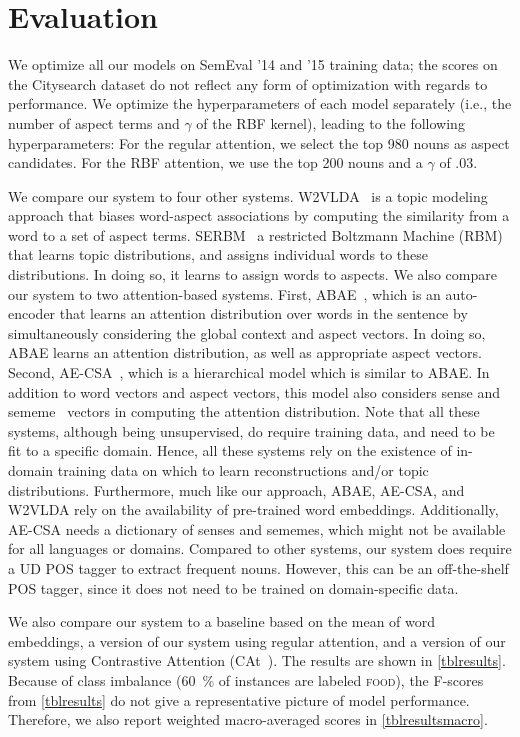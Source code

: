 \documentclass[11pt,a4paper]{article}
\newlength{\catheight}
\newcommand{\ourmodel}{CAt~\raisebox{-0.1ex}{\texttt{[image: fig/cat]}}} \definecolor{aspectcolor}{HTML}{fb7e5e}
\begin{document}
\section{Evaluation}

We optimize all our models on SemEval '14 and '15 training data;
the scores on the Citysearch dataset do not reflect any form of optimization with regards to performance.
We optimize the hyperparameters of each model separately
(i.e., the number of aspect terms and $\gamma$ of the RBF kernel), leading to the following hyperparameters:
For the regular attention, we select the top 980 nouns as aspect candidates.
For the RBF attention, we use the top 200 nouns and a $\gamma$ of .03.

We compare our system to four other systems.
W2VLDA~\citep{garcia2018w2vlda} is a topic modeling approach that biases word-aspect associations by computing the similarity from a word to a set of aspect terms.
SERBM~\citep{wang2015sentiment} a restricted Boltzmann Machine (RBM) that learns topic distributions, and assigns individual words to these distributions. 
In doing so, it learns to assign words to aspects.
We also compare our system to two attention-based systems. First, ABAE~\citep{he2017unsupervised}, which is an auto-encoder that learns an attention distribution over words in the sentence by simultaneously considering the global context and aspect vectors.
In doing so, ABAE learns an attention distribution, as well as appropriate aspect vectors.
Second, AE-CSA~\cite{luo2019unsupervised}, which is a hierarchical model which is similar to ABAE. 
In addition to word vectors and aspect vectors, this model also considers sense and sememe~\cite{bloomfield1926set} vectors in computing the attention distribution.
Note that all these systems, although being unsupervised, do require training data, and need to be fit to a specific domain.
Hence, all these systems rely on the existence of in-domain training data on which to learn reconstructions and/or topic distributions.
Furthermore, much like our approach, ABAE, AE-CSA, and W2VLDA rely on the availability of pre-trained word embeddings.
Additionally, AE-CSA needs a dictionary of senses and sememes, which might not be available for all languages or domains.
Compared to other systems, our system does require a UD POS tagger to extract frequent nouns.
However, this can be an off-the-shelf POS tagger, since it does not need to be trained on domain-specific data.

We also compare our system to a baseline based on the mean of word embeddings, a version of our system using regular attention, and a version of our system using Contrastive Attention (\ourmodel).
The results are shown in \autoref{tblresults}.
Because of class imbalance
(60~\% of instances are labeled \textsc{food}),
the F-scores from \ref{tblresults} do not give a representative
picture of model performance.
Therefore, we also report weighted macro-averaged scores in \autoref{tblresultsmacro}.
\end{document}
